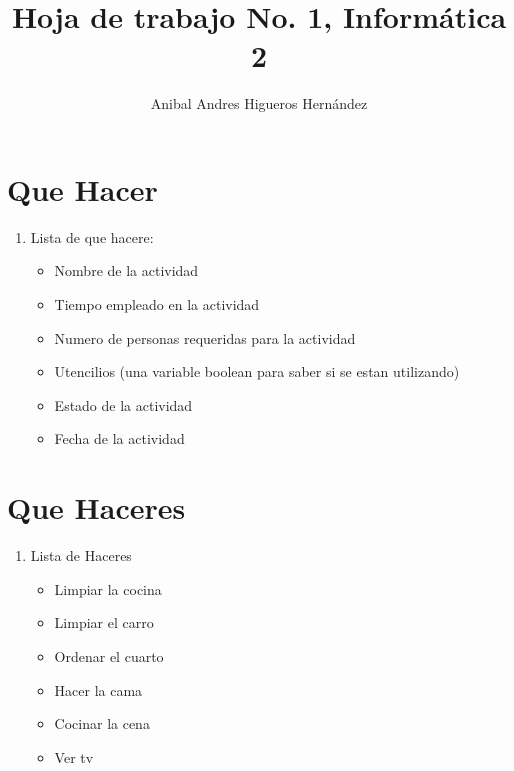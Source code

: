 \documentclass{article}
\begin{document}
    \usepackage{color}

        \title{Hoja de trabajo No. 1, Informática 2}
        \author{Anibal Andres Higueros Hernández}
        \maketitle
        
        \section{Que Hacer}
        \begin{enumerate}
            \item Lista de que hacere:
            \begin{itemize}
                \item Nombre de la actividad
                \item Tiempo empleado en la actividad
                \item Numero de personas requeridas para la actividad
                \item Utencilios (una variable boolean para saber si se estan utilizando)
                \item Estado de la actividad
                \item Fecha de la actividad
            \end{itemize}
        \end{enumerate}
        \section{Que Haceres}
        \begin{enumerate}
           \item Lista de Haceres
           \begin{itemize}
               \item Limpiar la cocina
               \item Limpiar el carro
               \item Ordenar el cuarto
               \item Hacer la cama
               \item Cocinar la cena
               \item Ver tv
           \end{itemize}
        \end{enumerate}
    
\end{document}
